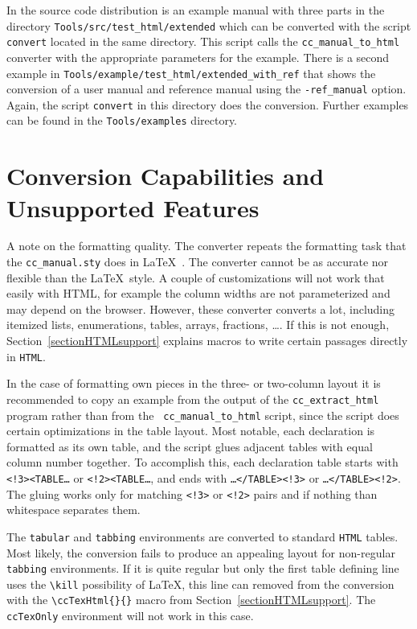 \documentclass[11pt]{article}
\makeatletter
\newcommand{\Mindex}[1]{\index{#1@\protect\Backslash{\tt #1}}}
\makeatother
\begin{document}
In the source code distribution is an example manual with three parts
in the directory {\tt Tools/src/test\_html/extended} which can be converted
with the script {\tt convert} located in the same directory. This
script calls the {\tt cc\_manual\_to\_html} converter with the
appropriate parameters for the example.  There is a second example in
{\tt Tools/example/test\_html/extended\_with\_ref} that shows the conversion
of a user manual and reference manual using the {\tt -ref\_manual} 
option.  Again, the script {\tt convert} in this directory does the
conversion.  Further examples can be found in the \texttt{Tools/examples}
directory.

\section{Conversion Capabilities and Unsupported Features}

A note on the formatting quality. The converter repeats the formatting
task that the {\tt cc\_manual.sty} does in \LaTeX~\cite{k-clswr-99}.
The converter cannot be as accurate nor flexible than the \LaTeX\ 
style. A couple of customizations will not work that easily with HTML,
for example the column widths are not parameterized and may depend on
the browser.  However, these converter converts a lot, including
itemized lists, enumerations, tables, arrays, fractions, \ldots.  If
this is not enough, Section~\ref{sectionHTMLsupport} explains macros
to write certain passages directly in {\tt HTML}.

In the case of formatting own pieces in the three- or two-column
layout it is recommended to copy an example from the output of the
{\tt cc\_extract\_html} program rather than from the {\tt
  cc\_manual\_to\_html} script, since the script does certain
optimizations in the table layout. Most notable, each declaration is
formatted as its own table, and the script glues adjacent tables with
equal column number together. To accomplish this, each declaration
table starts with {\tt <!3><TABLE\ldots} or {\tt <!2><TABLE\ldots},
and ends with {\tt\ldots </TABLE><!3>} or {\tt\ldots </TABLE><!2>}.
The gluing works only for matching {\tt <!3>} or {\tt <!2>} pairs and
if nothing than whitespace separates them.

\Mindex{kill}
The {\tt tabular} and {\tt tabbing} environments are converted to
standard {\tt HTML} tables. Most likely, the conversion fails to
produce an appealing layout for non-regular {\tt tabbing}
environments. If it is quite regular but only the first table defining
line uses the \verb+\kill+ possibility of \LaTeX, this line can
removed from the conversion with the \verb+\ccTexHtml{}{}+ macro from
Section~\ref{sectionHTMLsupport}. The {\tt ccTexOnly} environment will
not work in this case.
\end{document}
